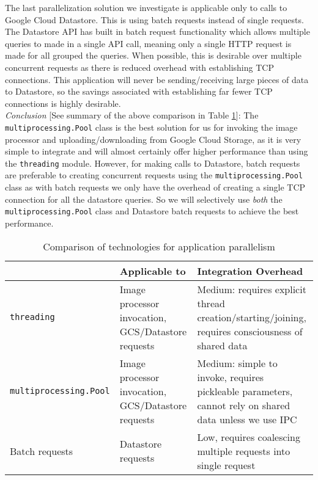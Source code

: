 \documentclass[10pt, onecolumn, draftclsnofoot, letterpaper, compsoc]{IEEEtran}
\begin{document}
The last parallelization solution we investigate is applicable only to calls to
Google Cloud Datastore. This is using batch requests instead of single requests.
The Datastore API has built in batch request functionality which allows multiple
queries to made in a single API call, meaning only a single HTTP request is made
for all grouped the queries\cite{batches}. When possible, this is desirable over
multiple concurrent requests as there is reduced overhead with establishing
TCP connections. This application will never be sending/receiving large
pieces of data to Datastore, so the savings associated with establishing
far fewer TCP connections is highly desirable. \\

\textit{Conclusion} [See summary of the above comparison in Table \ref{table:bret3}]:
The {\tt multiprocessing.Pool} class is the best solution for us
for invoking the image processor and uploading/downloading from Google Cloud
Storage, as it is very simple to integrate and will almost certainly offer
higher performance than using the {\tt threading} module. However, for making calls
to Datastore, batch requests are preferable to creating concurrent requests using the
{\tt multiprocessing.Pool} class as with batch requests we only have the overhead
of creating a single TCP connection for all the datastore queries. So we will selectively
use \textit{both} the {\tt multiprocessing.Pool} class and Datastore batch requests to
achieve the best performance. \\

\begin{table}[h]
\centering
\caption{Comparison of technologies for application parallelism}
\begin{tabular}{|p{4.2cm}|p{4.2cm}|p{4.2cm}|}
\cline{3-3}
\hline

 & Applicable to & Integration Overhead \\ \hline

{\tt threading} & Image processor invocation, GCS/Datastore requests
& Medium: requires explicit thread creation/starting/joining,
requires consciousness of shared data \\ \hline

{\tt multiprocessing.Pool} & Image processor invocation, GCS/Datastore requests
& Medium: simple to invoke, requires pickleable parameters, cannot rely
on shared data unless we use IPC \\ \hline

Batch requests & Datastore requests & Low, requires coalescing multiple
requests into single request  \\ \hline

\end{tabular}
\label{table:bret3}
\end{table}
\end{document}
